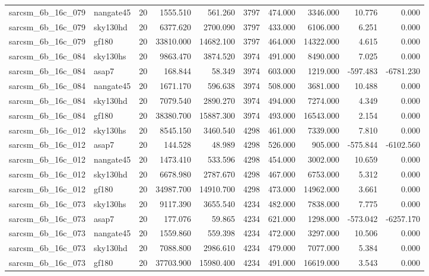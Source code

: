 \documentclass{article}
\begin{document}
\begin{longtable}{llrrrrrrrr}
sarcsm\_6b\_16c\_079 & nangate45 & 20 & 1555.510 & 561.260 & 3797 & 474.000 & 3346.000 & 10.776 & 0.000 \\
sarcsm\_6b\_16c\_079 & sky130hd & 20 & 6377.620 & 2700.090 & 3797 & 433.000 & 6106.000 & 6.251 & 0.000 \\
sarcsm\_6b\_16c\_079 & gf180 & 20 & 33810.000 & 14682.100 & 3797 & 464.000 & 14322.000 & 4.615 & 0.000 \\
sarcsm\_6b\_16c\_084 & sky130hs & 20 & 9863.470 & 3874.520 & 3974 & 491.000 & 8490.000 & 7.025 & 0.000 \\
sarcsm\_6b\_16c\_084 & asap7 & 20 & 168.844 & 58.349 & 3974 & 603.000 & 1219.000 & -597.483 & -6781.230 \\
sarcsm\_6b\_16c\_084 & nangate45 & 20 & 1671.170 & 596.638 & 3974 & 508.000 & 3681.000 & 10.488 & 0.000 \\
sarcsm\_6b\_16c\_084 & sky130hd & 20 & 7079.540 & 2890.270 & 3974 & 494.000 & 7274.000 & 4.349 & 0.000 \\
sarcsm\_6b\_16c\_084 & gf180 & 20 & 38380.700 & 15887.300 & 3974 & 493.000 & 16543.000 & 2.154 & 0.000 \\
sarcsm\_6b\_16c\_012 & sky130hs & 20 & 8545.150 & 3460.540 & 4298 & 461.000 & 7339.000 & 7.810 & 0.000 \\
sarcsm\_6b\_16c\_012 & asap7 & 20 & 144.528 & 48.989 & 4298 & 526.000 & 905.000 & -575.844 & -6102.560 \\
sarcsm\_6b\_16c\_012 & nangate45 & 20 & 1473.410 & 533.596 & 4298 & 454.000 & 3002.000 & 10.659 & 0.000 \\
sarcsm\_6b\_16c\_012 & sky130hd & 20 & 6678.980 & 2787.670 & 4298 & 467.000 & 6753.000 & 5.312 & 0.000 \\
sarcsm\_6b\_16c\_012 & gf180 & 20 & 34987.700 & 14910.700 & 4298 & 473.000 & 14962.000 & 3.661 & 0.000 \\
sarcsm\_6b\_16c\_073 & sky130hs & 20 & 9117.390 & 3655.540 & 4234 & 482.000 & 7838.000 & 7.775 & 0.000 \\
sarcsm\_6b\_16c\_073 & asap7 & 20 & 177.076 & 59.865 & 4234 & 621.000 & 1298.000 & -573.042 & -6257.170 \\
sarcsm\_6b\_16c\_073 & nangate45 & 20 & 1559.860 & 559.398 & 4234 & 472.000 & 3297.000 & 10.506 & 0.000 \\
sarcsm\_6b\_16c\_073 & sky130hd & 20 & 7088.800 & 2986.610 & 4234 & 479.000 & 7077.000 & 5.384 & 0.000 \\
sarcsm\_6b\_16c\_073 & gf180 & 20 & 37703.900 & 15980.400 & 4234 & 491.000 & 16619.000 & 3.543 & 0.000 \\

\end{longtable}
\end{document}

